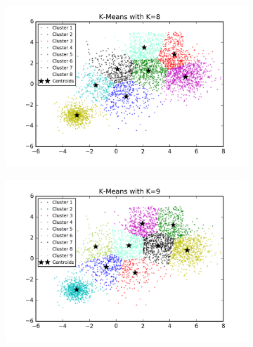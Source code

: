 \begin{description}
\begin{description}
\begin{figure}[!h]
\begin{subfigure}[b]{0.475\textwidth}
        \end{subfigure}
        \hfill
        \begin{subfigure}[b]{0.475\textwidth}  
            \centering 
            \includegraphics[width=\textwidth]{./figures/bigClustering_kMeans_8.png}
        \end{subfigure}
        \begin{subfigure}[b]{0.475\textwidth}   
            \centering 
            \includegraphics[width=\textwidth]{./figures/bigClustering_kMeans_9.png}
        \end{subfigure}
        \hfill
        \begin{subfigure}[b]{0.475\textwidth}   
            \centering 

\end{subfigure}
\end{figure}
\end{description}
\end{description}
